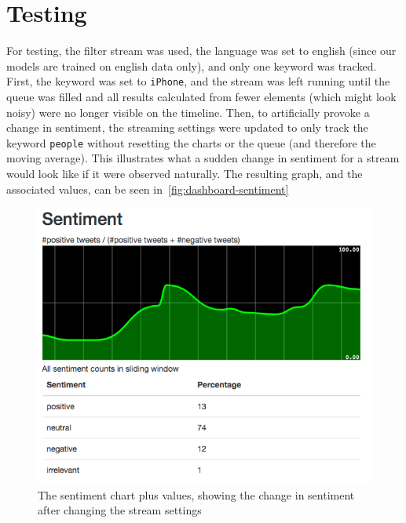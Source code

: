\section{Testing}
\label{sec:testing}

For testing, the filter stream was used,
the language was set to english (since our models are trained on english data only),
and only one keyword was tracked.
\\%
First, the keyword was set to \texttt{iPhone},
and the stream was left running until the queue was filled and all results calculated from fewer elements
(which might look noisy) were no longer visible on the timeline.
Then, to artificially provoke a change in sentiment,
the streaming settings were updated to only track the keyword \texttt{people} without resetting the charts or the queue (and therefore the moving average).
This illustrates what a sudden change in sentiment for a stream would look like if it were observed naturally.
The resulting graph, and the associated values, can be seen in~\autoref{fig:dashboard-sentiment}
\\%

\begin{figure}
    \centering
    \caption{The sentiment chart plus values, showing the change in sentiment after changing the stream settings}
    \label{fig:dashboard-sentiment}
    \includegraphics[width=\textwidth]{../images/dashboard_sentiment.png}
\end{figure}

